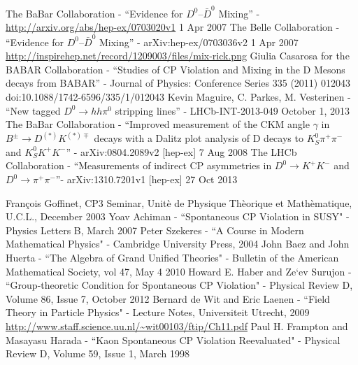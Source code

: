 \documentclass[floatfix,aps,prd,amsmath,amssymb]{revtex4}
\begin{document}
\begin{thebibliography}{10}
The BaBar Collaboration - ``Evidence for $D^{0}–\bar{D}^{0}$ Mixing'' - \url{http://arxiv.org/abs/hep-ex/0703020v1} 1 Apr 2007 
The Belle Collaboration - ``Evidence for $D^{0}–\bar{D}^{0}$ Mixing'' - arXiv:hep-ex/0703036v2 1 Apr 2007 
\url{http://inspirehep.net/record/1209003/files/mix-rick.png}
Giulia Casarosa for the BABAR Collaboration - ``Studies of CP Violation and Mixing in the D Mesons decays from BABAR'' - Journal of Physics: Conference Series 335 (2011) 012043   doi:10.1088/1742-6596/335/1/012043
Kevin Maguire, C. Parkes, M. Vesterinen - ``New tagged $D^{0} \rightarrow h h \pi^{0}$ stripping lines'' - LHCb-INT-2013-049 October 1, 2013
The BaBar Collaboration - ``Improved measurement of the CKM angle $\gamma$ in $B^{\pm} \rightarrow D^{(*)}K^{(*)\mp}$ decays with a Dalitz plot analysis of D decays to $K^{0}_S \pi^{+} \pi^{-}$ and $K^{0}_{S} K^{+} K^{−}$'' - arXiv:0804.2089v2 [hep-ex] 7 Aug 2008
The LHCb Collaboration - ``Measurements of indirect CP asymmetries in $D^{0} \rightarrow K^{+}K^{-}$ and $D^{0} \rightarrow \pi^{+} \pi^{-}$''- arXiv:1310.7201v1 [hep-ex] 27 Oct 2013


Fran\c{c}ois Goffinet, CP3 Seminar, Unit\`{e} de Physique Th\`{e}orique et Math\`{e}matique, U.C.L., December 2003
Yoav Achiman -  ``Spontaneous CP Violation in SUSY" - Physics Letters B, March 2007
Peter Szekeres - ``A Course in Modern Mathematical Physics" - Cambridge University Press, 2004
John Baez and John Huerta - ``The Algebra of Grand Unified Theories" - Bulletin of the American Mathematical Society, vol 47, May 4 2010
Howard E. Haber and Ze`ev Surujon - ``Group-theoretic Condition for Spontaneous CP Violation" - Physical Review D, Volume 86, Issue 7, October 2012
Bernard de Wit and Eric Laenen - ``Field Theory in Particle Physics" - Lecture Notes, Universiteit Utrecht, 2009 \url{http://www.staff.science.uu.nl/~wit00103/ftip/Ch11.pdf}
Paul H. Frampton and Masayasu Harada - ``Kaon Spontaneous CP Violation Reevaluated" - Physical Review D, Volume 59, Issue 1, March 1998

\end{thebibliography}
\end{document}

